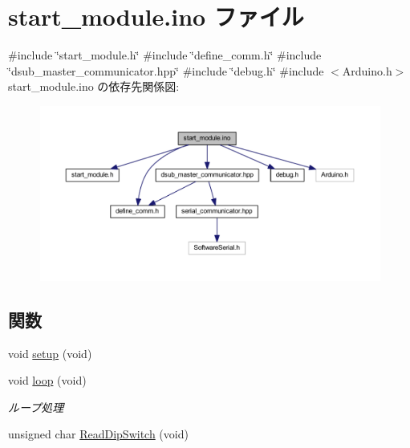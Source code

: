 \hypertarget{start__module_8ino}{}\section{start\+\_\+module.\+ino ファイル}
\label{start__module_8ino}
{\ttfamily \#include \char`\"{}start\+\_\+module.\+h\char`\"{}}\newline
{\ttfamily \#include \char`\"{}define\+\_\+comm.\+h\char`\"{}}\newline
{\ttfamily \#include \char`\"{}dsub\+\_\+master\+\_\+communicator.\+hpp\char`\"{}}\newline
{\ttfamily \#include \char`\"{}debug.\+h\char`\"{}}\newline
{\ttfamily \#include $<$Arduino.\+h$>$}\newline
start\+\_\+module.\+ino の依存先関係図\+:
\nopagebreak
\begin{figure}[H]
\begin{center}
\leavevmode
\includegraphics[width=350pt]{start__module_8ino__incl}
\end{center}
\end{figure}
\subsection*{関数}
\begin{DoxyCompactItemize}
\item 
void \mbox{\hyperlink{start__module_8ino_a7dfd9b79bc5a37d7df40207afbc5431f}{setup}} (void)
\item 
void \mbox{\hyperlink{start__module_8ino_a0b33edabd7f1c4e4a0bf32c67269be2f}{loop}} (void)
\begin{DoxyCompactList}\small\item\em ループ処理 \end{DoxyCompactList}\item 
unsigned char \mbox{\hyperlink{start__module_8ino_a77b0a767d95108a48a54b857588d2863}{Read\+Dip\+Switch}} (void)
\end{DoxyCompactItemize}
